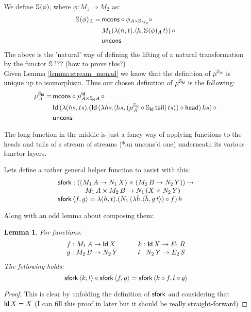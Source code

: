 \documentclass{article}
\newtheorem{lemma}[definition]{Lemma}
\begin{document}
We define $\mathbb{S}_{}(\phi)$, where $\phi: M_1 \Rightarrow M_2$ as:
\begin{align*}
	\mathbb{S}_{}(\phi)_A =\,&\mathsf{mcons} \circ \phi_{A \times \mathbb{S}_{M_2}} \circ\, \\
	&M_1(\lambda (h, t).\langle h, \mathbb{S}_{}(\phi)_A\, t \rangle)\, \circ\, \\ 
	&\mathsf{uncons}
\end{align*}
The above is the 'natural' way of defining the lifting of a natural transformation by the functor $\mathbb{S}_{}$??? (how to prove this?) \\

Given Lemma \ref{lemma:stream_monad} we know that the definition of $\mu^{\mathbb{S}_{\mathsf{Id}}}$ is unique up to isomorphism. Thus our chosen definition of $\mu^{\mathbb{S}_{\mathsf{Id}}}$ is the following:
\begin{align*}
	\mu^{\mathbb{S}_{\mathsf{Id}}}_A =\, &\mathsf{mcons} \circ \mu^{\mathsf{Id}}_{A \times \mathbb{S}_{\mathsf{Id}}A}\, \circ\, \\
	&\mathsf{Id}\,(\lambda (hs, ts). (\mathsf{Id}\,(\lambda \bar{hs} . \langle \bar{hs}, (\mu^{\mathbb{S}_{\mathsf{Id}}}_A \circ \mathbb{S}_{\mathsf{Id}}\,\mathsf{tail})\,ts \rangle) \circ \mathsf{head})\,hs)\, \circ\, \\
	&\mathsf{uncons}
\end{align*}

The long function in the middle is just a fancy way of applying functions to the heads and tails of a stream of streams (*an uncons'd one) underneath its various functor layers.

Lets define a rather general helper function to assist with this:
$$
\begin{array}{ll}
\mathsf{sfork} : ((M_1\, A \rightarrow N_1\, X) \times  (M_2\, B \rightarrow N_2\, Y)) \to 
\\ \qquad\qquad M_1\, A \times M_2\, B \to N_1\,(X \times N_2\,Y) \\
\mathsf{sfork}\,\langle f, g \rangle = \lambda (h, t). (N_1\,(\lambda \bar{h} . \langle \bar{h}, g\,t \rangle) \circ f)\,h
\end{array}
$$

Along with an odd lemma about composing them:
\begin{lemma}\label{lemma:sfork_comp}
For functions: 
$$
\begin{array}{ll}
f : M_1\,A \to \mathsf{Id}\,X & \qquad
k : \mathsf{Id}\,X \to E_1\,R  \\
g : M_2\,B \to N_2\,Y &\qquad
l : N_2\,Y \to E_2\,S
\end{array}
$$
The following holds:
$$
\mathsf{sfork}\,\langle k, l \rangle \circ \mathsf{sfork}\,\langle f, g \rangle =  \mathsf{sfork}\,\langle k \circ f, l \circ g \rangle
$$
\end{lemma}
\begin{proof}
This is clear by unfolding the definition of $\mathsf{sfork}$ and considering that $\mathsf{Id}\,X = X$ (I can fill this proof in later but it should be really straight-forward)
\end{proof}
\end{document}
